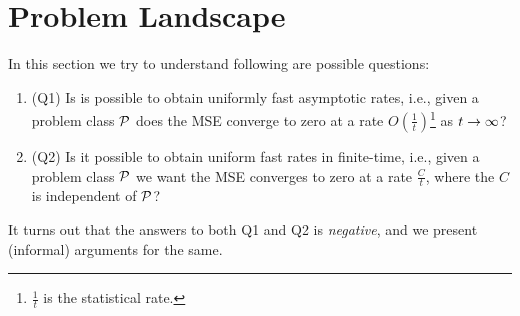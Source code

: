 \section{Problem Landscape}\label{sec:land}
In this section we try to understand following are possible questions:
\begin{enumerate}[leftmargin=*] 
\item (Q1) Is is possible to obtain uniformly fast asymptotic rates, i.e., given a problem class $\P$ does the MSE converge to zero at a rate $O(\frac{1}{t})$\footnote{$\frac{1}{t}$ is the statistical rate.} as $t\ra\infty$?
\item (Q2) Is it possible to obtain uniform fast rates in finite-time, i.e., given a problem class $\P$ we want the MSE converges to zero at a rate $\frac{C}{t}$, where the $C$ is independent of $\P$?
\end{enumerate}
It turns out that the answers to both Q1 and Q2 is \emph{negative}, and we present (informal) arguments for the same.

